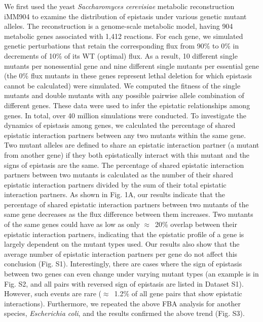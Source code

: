We first used the yeast \textit{Saccharomyces cerevisiae} metabolic
reconstruction iMM904 \citep{Fong2005} to examine the distribution of epistasis
under various genetic mutant alleles. The reconstruction is a
genome-scale metabolic model, having 904 metabolic genes associated
with 1,412 reactions. For each gene, we simulated genetic
perturbations that retain the corresponding flux from 90\% to 0\% in
decrements of 10\% of its WT (optimal) flux. As a result, 10 different
single mutants per nonessential gene and nine different single mutants
per essential gene (the 0\% flux mutants in these genes represent
lethal deletion for which epistasis cannot be calculated) were
simulated. We computed the fitness of the single mutants and double
mutants with any possible pairwise allele combination of different
genes. These data were used to infer the epistatic relationships among
genes. In total, over 40 million simulations were conducted.  To
investigate the dynamics of epistasis among genes, we calculated the
percentage of shared epistatic interaction partners between any two
mutants within the same gene. Two mutant alleles are defined to share
an epistatic interaction partner (a mutant from another gene) if they
both epistatically interact with this mutant and the signs of
epistasis are the same. The percentage of shared epistatic interaction
partners between two mutants is calculated as the number of their
shared epistatic interaction partners divided by the sum of their
total epistatic interaction partners. As shown in Fig. 1A, our results
indicate that the percentage of shared epistatic interaction partners
between two mutants of the same gene decreases as the flux difference
between them increases. Two mutants of the same genes could have as
low as only $\approx$~20\% overlap between their epistatic interaction
partners, indicating that the epistatic profile of a gene is largely
dependent on the mutant types used. Our results also show that the
average number of epistatic interaction partners per gene do not
affect this conclusion (Fig. S1). Interestingly, there are cases where
the sign of epistasis between two genes can even change under varying
mutant types (an example is in Fig. S2, and all pairs with reversed
sign of epistasis are listed in Dataset S1). However, such events are
rare ($\approx$~1.2\% of all gene pairs that show epistatic
interactions). Furthermore, we repeated the above FBA analysis for
another species, \textit{Escherichia coli}, and the results confirmed
the above trend (Fig. S3).


